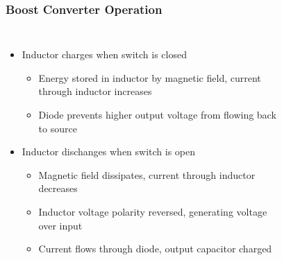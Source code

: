 \documentclass{beamer}
\begin{document}
\begin{frame}
\frametitle{Boost Converter Operation}
\begin{columns}[t]
\begin{itemize}
  \item Inductor charges when switch is closed
  \begin{itemize}
    \item Energy stored in inductor by magnetic field, current through inductor increases
    \item Diode prevents higher output voltage from flowing back to source
  \end{itemize}
  \item<2-> Inductor dischanges when switch is open
  \begin{itemize}
    \item Magnetic field dissipates, current through inductor decreases
    \item Inductor voltage polarity reversed, generating voltage over input
    \item Current flows through diode, output capacitor charged
  \end{itemize}  
\end{itemize}

\begin{figure}
  \centering
\end{figure}
\end{columns}
\end{frame}
\end{document}
